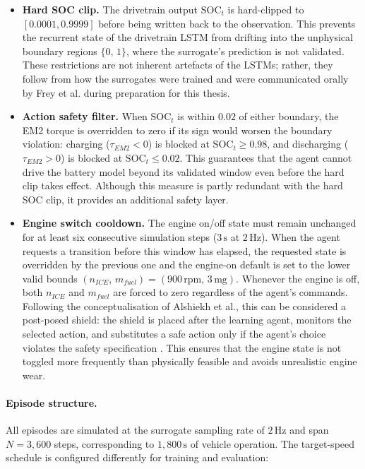 \begin{itemize}
  \item \textbf{Hard \ac{SOC} clip.} The drivetrain output $\mathrm{SOC}_t$ is hard-clipped to $[0.0001, 0.9999]$ before being written back to the observation. This prevents the recurrent state of the drivetrain \ac{LSTM} from drifting into the unphysical boundary regions $\{0,\,1\}$, where the surrogate's prediction is not validated. These restrictions are not inherent artefacts of the \ac{LSTM}s; rather, they follow from how the surrogates were trained and were communicated orally by Frey et al. \cite{frey_data-based_2025} during preparation for this thesis.
  \item \textbf{Action safety filter.} When $\mathrm{SOC}_t$ is within $0.02$ of either boundary, the \ac{EM2} torque is overridden to zero if its sign would worsen the boundary violation: charging ($\tau_{EM2} < 0$) is blocked at $\mathrm{SOC}_t \ge 0.98$, and discharging ($\tau_{EM2} > 0$) is blocked at $\mathrm{SOC}_t \le 0.02$. This guarantees that the agent cannot drive the battery model beyond its validated window even before the hard clip takes effect. Although this measure is partly redundant with the hard \ac{SOC} clip, it provides an additional safety layer.
  \item \textbf{Engine switch cooldown.} The engine on/off state must remain unchanged for at least six consecutive simulation steps ($3\,\text{s}$ at $2\,\text{Hz}$). When the agent requests a transition before this window has elapsed, the requested state is overridden by the previous one and the engine-on default is set to the lower valid bounds $(n_{ICE},\,m_{fuel}) = (900\,\text{rpm},\,3\,\text{mg})$. Whenever the engine is off, both $n_{ICE}$ and $m_{fuel}$ are forced to zero regardless of the agent's commands. Following the conceptualisation of Alshiekh et al., this can be considered a post-posed shield: the shield is placed after the learning agent, monitors the selected action, and substitutes a safe action only if the agent's choice violates the safety specification \cite{alshiekh_safe_2017}. This ensures that the engine state is not toggled more frequently than physically feasible and avoids unrealistic engine wear.
\end{itemize}

\paragraph{Episode structure.}
All episodes are simulated at the surrogate sampling rate of $2\,\text{Hz}$ and span $N = 3{,}600$ steps, corresponding to $1{,}800\,\text{s}$ of vehicle operation. The target-speed schedule is configured differently for training and evaluation:

